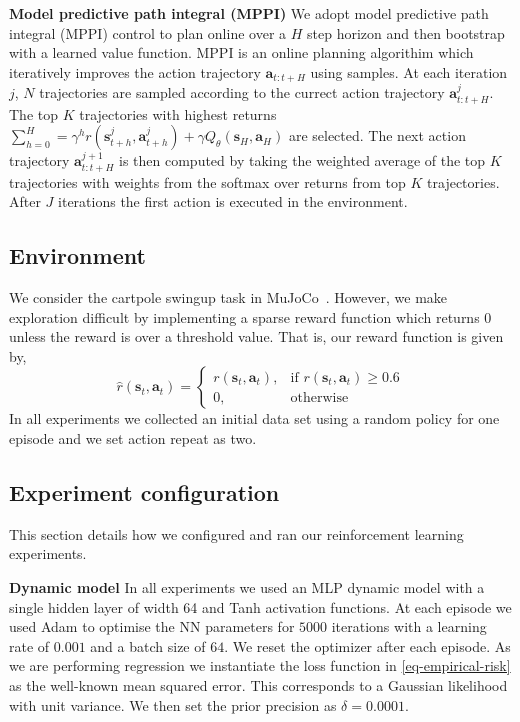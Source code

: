 \documentclass{article}
\newcommand{\state}{\ensuremath{\mathbf{s}}}
\newcommand{\action}{\ensuremath{\mathbf{a}}}
\newcommand{\Horizon}{\ensuremath{H}}
\begin{document}

\textbf{Model predictive path integral (MPPI)}
We adopt model predictive path integral (MPPI) control \cite{panSample2015,williamsModel2017}
to plan online over a $H$ step horizon and then bootstrap with a learned value function.
MPPI is an online planning algorithim which iteratively improves the action trajectory $\action_{t:t+H}$ using samples.
At each iteration $j$, $N$ trajectories are sampled according to the currect action trajectory $\action^{j}_{t:t+H}$.
The top $K$ trajectories with highest returns $\sum_{h=0}^{H} = \gamma^{h} r(\state^{j}_{t+h}, \action^{j}_{t+h}) + \gamma Q_{\theta}(\state_{\Horizon}, \action_{H})$ are selected.
The next action trajectory $\action^{j+1}_{t:t+H}$ is then computed by taking the weighted average of the top $K$ trajectories
with weights from the softmax over returns from top $K$ trajectories.
After $J$ iterations the first action is executed in the environment.


\subsection{Environment}
We consider the cartpole swingup task in MuJoCo~\cite{todorov2012mujoco}.
However, we make exploration difficult by implementing a sparse reward function which returns $0$ unless the reward is over a threshold value. That is, our reward function is given by,
$$\hat{r}(\state_{t}, \action_{t}) =
\begin{cases}
    r(\state_{t}, \action_{t}),& \text{if } r(\state_{t}, \action_{t})\geq 0.6\\
    0,              & \text{otherwise}
\end{cases}
$$
In all experiments we collected an initial data set using a random policy for one episode and we set action repeat as two.

\subsection{Experiment configuration}
%
This section details how we configured and ran our reinforcement learning experiments.

\textbf{Dynamic model}
In all experiments we used an MLP dynamic model with a single hidden layer of width 64 and Tanh activation functions.
At each episode we used Adam \cite{adam} to optimise the NN parameters for $5000$ iterations with a learning rate of $0.001$ and a batch size of $64$.
We reset the optimizer after each episode.
As we are performing regression we instantiate the loss function in \cref{eq-empirical-risk} as the well-known mean squared error.
This corresponds to a Gaussian likelihood with unit variance.
We then set the prior precision as $\delta=0.0001$.
\end{document}
